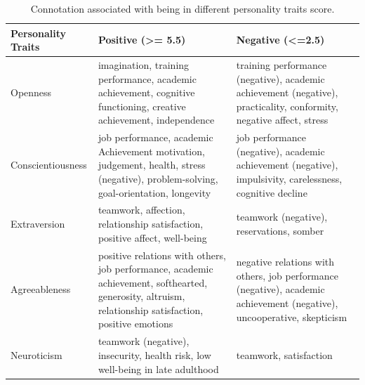 \documentclass[conference]{IEEEtran}
\begin{document}
\begin{table}
\begin{tabular}{|p{2.3cm}|p{4.2cm}|p{4.2cm}|}
\hline
Personality Traits & Positive (\textgreater{}= 5.5) & Negative (\textless{}=2.5) \\
\hline
Openness           & imagination, training performance, academic achievement, cognitive functioning, creative achievement, independence & training performance (negative), academic achievement (negative), practicality, conformity, negative affect, stress \\ \hline
Conscientiousness  & job performance, academic Achievement motivation, judgement, health, stress (negative),  problem-solving, goal-orientation, longevity & job performance (negative), academic achievement (negative), impulsivity, carelessness, cognitive decline \\ \hline
Extraversion       & teamwork, affection, relationship satisfaction, positive affect, well-being & teamwork (negative), reservations, somber \\ \hline
Agreeableness      & positive relations with others, job performance, academic achievement, softhearted, generosity, altruism, relationship satisfaction, positive emotions & negative relations with others, job performance (negative), academic achievement (negative), uncooperative, skepticism \\ \hline
Neuroticism        & teamwork (negative), insecurity, health risk, low well-being in late adulthood & teamwork, satisfaction \\ \hline
\end{tabular}
\label{table:ptraits}
\caption{Connotation associated with being in different personality traits score.}
\end{table}
\fi
 

\end{document}
